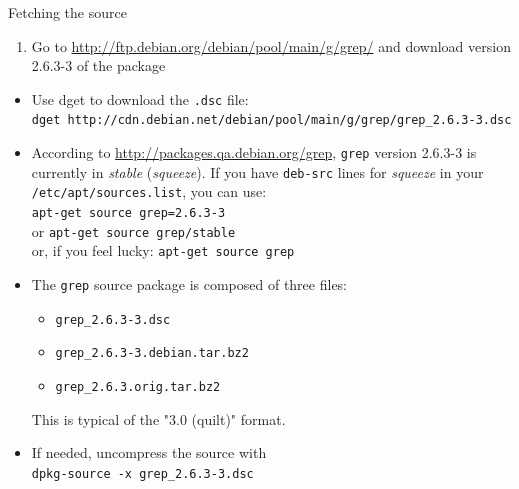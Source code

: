 \documentclass[10pt,final]{beamer}
\begin{document}
\begin{frame}{Fetching the source}
\begin{enumerate}
	\item Go to \url{http://ftp.debian.org/debian/pool/main/g/grep/} and
		download version 2.6.3-3 of the package
\end{enumerate}
\begin{itemize}
	\item Use dget to download the \texttt{.dsc} file:\\
		{\small \texttt{dget http://cdn.debian.net/debian/pool/main/g/grep/grep\_2.6.3-3.dsc}}
		\hbr
	\item According to \url{http://packages.qa.debian.org/grep}, \texttt{grep} version 2.6.3-3 is currently in \textsl{stable} (\textsl{squeeze}). If you have \texttt{deb-src} lines for \textsl{squeeze} in your \texttt{/etc/apt/sources.list}, you can use:\\
		\texttt{apt-get source grep=2.6.3-3}\\
		or \texttt{apt-get source grep/stable}\\
		or, if you feel lucky: \texttt{apt-get source grep}
	\hbr
	\item The \texttt{grep} source package is composed of three files:
		\begin{itemize}
			\item \texttt{grep\_2.6.3-3.dsc}
			\item \texttt{grep\_2.6.3-3.debian.tar.bz2}
			\item \texttt{grep\_2.6.3.orig.tar.bz2}
		\end{itemize}
		This is typical of the "3.0 (quilt)" format.
	\hbr
\item If needed, uncompress the source with\\
	\texttt{dpkg-source -x grep\_2.6.3-3.dsc}
\end{itemize}
\end{frame}
\end{document}
